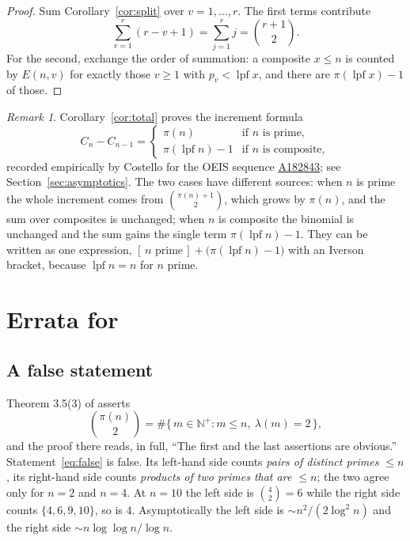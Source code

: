 \documentclass[a4paper,11pt,oneside,reqno]{amsart}
\theoremstyle{definition}
\theoremstyle{remark}
\newtheorem{remark}[definition]{Remark}
\theoremstyle{plain}
\newcommand{\NN}{\mathbb{N}}
\newcommand{\lpf}{\operatorname{lpf}}
\newcommand{\seqnum}[1]{\href{https://oeis.org/#1}{\underline{#1}}}
\begin{document}
\begin{proof}
  Sum Corollary~\ref{cor:split} over \(v = 1,\dots,r\). The first terms contribute
  \[
    \sum_{v = 1}^{r}(r-v+1) = \sum_{j = 1}^{r}j = \binom{r+1}{2}.
  \]
  For the second, exchange the order of summation: a composite \(x \le n\) is counted by \(E(n,v)\) for exactly those
  \(v \ge 1\) with \(p_v < \lpf x\), and there are \(\pi(\lpf x)-1\) of those.
\end{proof}

\begin{remark}
  Corollary~\ref{cor:total} proves the increment formula
  \[
    C_n-C_{n-1}=
    \begin{cases}
      \pi(n) & \text{if \(n\) is prime},\\[2pt]
      \pi(\lpf n)-1 & \text{if \(n\) is composite},
    \end{cases}
  \]
  recorded empirically by Costello for the OEIS sequence \seqnum{A182843}; see
  Section~\ref{sec:asymptotics}. The two cases have different sources: when
  \(n\) is prime the whole increment comes from \(\binom{\pi(n)+1}{2}\), which
  grows by \(\pi(n)\), and the sum over composites is unchanged; when \(n\) is
  composite the binomial is unchanged and the sum gains the single term
  \(\pi(\lpf n)-1\). They can be written as one expression,
  \([\,n\text{ prime}\,]+\bigl(\pi(\lpf n)-1\bigr)\) with an Iverson bracket,
  because \(\lpf n = n\) for \(n\) prime.
\end{remark}

\section{Errata for \texorpdfstring{\cite{Snellman2000}}{[Sne00]}}\label{sec:errata}

\subsection{A false statement}

Theorem 3.5(3) of \cite{Snellman2000} asserts
\begin{equation}\label{eq:false}
  \binom{\pi(n)}{2} = \#\{\,m \in \NN^+ : m \le n,\ \lambda(m) = 2\,\},
\end{equation}
and the proof there reads, in full, ``The first and the last assertions are
obvious.'' Statement~\eqref{eq:false} is false. Its left-hand side counts
\emph{pairs of distinct primes \(\le n\)}, its right-hand side counts
\emph{products of two primes that are \(\le n\)}; the two agree only for
\(n = 2\) and \(n = 4\). At \(n = 10\) the left side is \(\binom{4}{2} = 6\) while the
right side counts \(\{4,6,9,10\}\), so is \(4\). Asymptotically the left side is
\(\sim n^{2}/(2\log^{2}n)\) and the right side \(\sim n\log\log n/\log n\).
\end{document}
